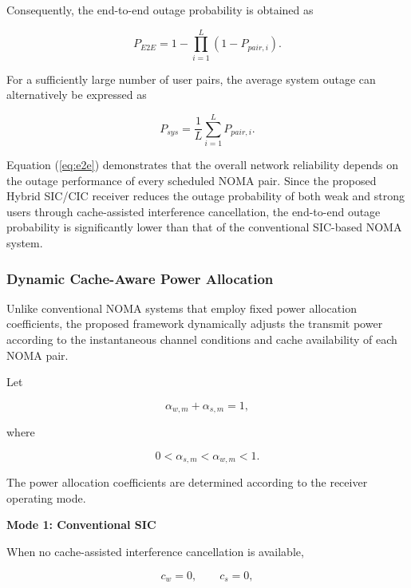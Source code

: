 \documentclass[12pt,a4paper]{article}
\begin{document}
Consequently, the end-to-end outage probability is obtained as

\begin{equation}
P_{E2E}
=
1-
\prod_{i=1}^{L}
\left(1-P_{pair,i}\right).
\label{eq:e2e}
\end{equation}

For a sufficiently large number of user pairs, the average system outage can alternatively be expressed as

\begin{equation}
P_{sys}
=
\frac{1}{L}
\sum_{i=1}^{L}
P_{pair,i}.
\label{eq:avg_system}
\end{equation}

Equation (\ref{eq:e2e}) demonstrates that the overall network reliability depends on the outage performance of every scheduled NOMA pair. Since the proposed Hybrid SIC/CIC receiver reduces the outage probability of both weak and strong users through cache-assisted interference cancellation, the end-to-end outage probability is significantly lower than that of the conventional SIC-based NOMA system.

\subsubsection{Dynamic Cache-Aware Power Allocation}

Unlike conventional NOMA systems that employ fixed power allocation coefficients, the proposed framework dynamically adjusts the transmit power according to the instantaneous channel conditions and cache availability of each NOMA pair.

Let

\begin{equation}
\alpha_{w,m}+\alpha_{s,m}=1,
\label{eq:power_sum}
\end{equation}

where

\begin{equation}
0<\alpha_{s,m}<\alpha_{w,m}<1.
\end{equation}

The power allocation coefficients are determined according to the receiver operating mode.

\textbf{Mode 1: Conventional SIC}

When no cache-assisted interference cancellation is available,

\[
c_w=0,\qquad c_s=0,
\]
\end{document}
